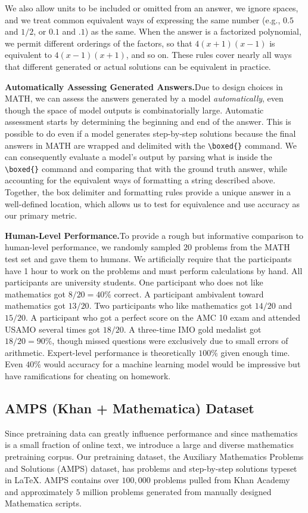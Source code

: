 We also allow units to be included or omitted from an answer, we ignore spaces, and we treat common equivalent ways of expressing the same number (e.g., $0.5$ and $1/2$, or $0.1$ and $.1$) as the same. When the answer is a factorized polynomial, we permit different orderings of the factors, so that $4(x+1)(x-1)$ is equivalent to $4(x-1)(x+1)$, and so on. These rules cover nearly all ways that different generated or actual solutions can be equivalent in practice. 

\textbf{Automatically Assessing Generated Answers.}\quad Due to design choices in MATH, we can assess the answers generated by a model \emph{automatically}, even though the space of model outputs is combinatorially large. Automatic assessment starts by determining the beginning and end of the answer. This is possible to do even if a model generates step-by-step solutions because the final answers in MATH are wrapped and delimited with the \verb|\boxed{}| command. We can consequently evaluate a model's output by parsing what is inside the \verb|\boxed{}| command and comparing that with the ground truth answer, while accounting for the equivalent ways of formatting a string described above. Together, the box delimiter and formatting rules provide a unique answer in a well-defined location, which allows us to test for equivalence and use accuracy as our primary metric.

\textbf{Human-Level Performance.}\quad To provide a rough but informative comparison to human-level performance, we randomly sampled $20$ problems from the MATH test set and gave them to humans. We artificially require that the participants have 1 hour to work on the problems and must perform calculations by hand. All participants are university students. One participant who does not like mathematics got $8/20=40\%$ correct. A participant ambivalent toward mathematics got $13/20$. Two participants who like mathematics got $14/20$ and $15/20$. A participant who got a perfect score on the AMC 10 exam and attended USAMO several times got $18/20$. A three-time IMO gold medalist got $18/20=90\%$, though missed questions were exclusively due to small errors of arithmetic. Expert-level performance is theoretically $100\%$ given enough time. Even $40\%$ would accuracy for a machine learning model would be impressive but have ramifications for cheating on homework.

\subsection{AMPS (Khan + Mathematica) Dataset} Since pretraining data can greatly influence performance \citep{Hernandez2021ScalingLF,Gururangan2020DontSP} and since mathematics is a small fraction of online text, we introduce a large and diverse mathematics pretraining corpus. Our pretraining dataset, the Auxiliary Mathematics Problems and Solutions (AMPS) dataset, has problems and step-by-step solutions typeset in \LaTeX{}. AMPS contains over $100,\!000$ problems pulled from Khan Academy and approximately $5$ million problems generated from manually designed Mathematica scripts.

